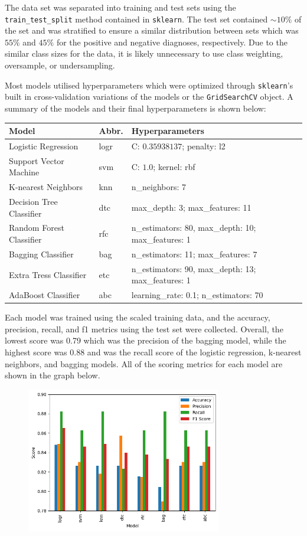 \documentclass[12pt]{article}
\begin{document}
The data set was separated into training and test sets using the \texttt{train\_test\_split}
method contained in \texttt{sklearn}. The test set contained $\sim10\%$ of the set and was 
stratified to ensure a similar distribution between sets which was $55\%$ and $45\%$ for the
positive and negative diagnoses, respectively. Due to the similar class sizes for the data, 
it is likely unnecessary to use class weighting, oversample, or undersampling. 

Most models utilised hyperparameters which were optimized through \texttt{sklearn}'s built 
in cross-validation variations of the models or the \texttt{GridSearchCV} object. A summary 
of the models and their final hyperparameters is shown below:
\begin{center}
    \begin{tabular}{l l l}
        \toprule
        Model & Abbr. & Hyperparameters \\
         \midrule
        Logistic Regression & logr & C: $0.35938137$; penalty: l2 \\
        Support Vector Machine & svm & C: $1.0$; kernel: rbf \\
        K-nearest Neighbors & knn & n\_neighbors: 7 \\
        Decision Tree Classifier & dtc & max\_depth: 3; max\_features: 11 \\
        Random Forest Classifier & rfc & n\_estimators: 80, max\_depth: 10; max\_features: 1 \\
        Bagging Classifier & bag & n\_estimators: 11; max\_features: 7 \\
        Extra Tress Classifier & etc & n\_estimators: 90, max\_depth: 13; max\_features: 1\\
        AdaBoost Classifier & abc & learning\_rate: 0.1; n\_estimators: 70 \\
         \bottomrule
    \end{tabular}    
\end{center}
Each model was trained using the scaled training data, and the accuracy, precision, recall, 
and f1 metrics using the test set were collected. Overall, the lowest score was 0.79 which 
was the precision of the bagging model, while the highest score was 0.88 and was the recall 
score of the logistic regression, k-nearest neighbors, and bagging models. All of the 
scoring metrics for each model are shown in the graph below. 
\begin{figure}[ht]
    \centering
    \includegraphics[height=2.5in]{test_plot.png}
\end{figure}
\end{document}

